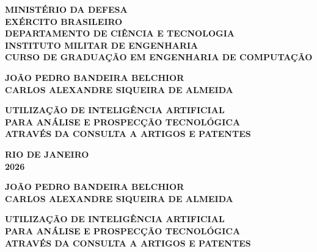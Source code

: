 \documentclass[12pt, a4paper]{article}
\begin{document}
\pagestyle{empty}

\begin{center}

  {\fontsize{12}{14}\selectfont\bfseries
    MINISTÉRIO DA DEFESA \\
    EXÉRCITO BRASILEIRO \\
    DEPARTAMENTO DE CIÊNCIA E TECNOLOGIA \\
    INSTITUTO MILITAR DE ENGENHARIA \\
    CURSO DE GRADUAÇÃO EM ENGENHARIA DE COMPUTAÇÃO
  }

  \vspace{6cm}

  {\fontsize{12}{16}\selectfont\bfseries
    JOÃO PEDRO BANDEIRA BELCHIOR \\[4pt]
    CARLOS ALEXANDRE SIQUEIRA DE ALMEIDA
  }

  \vspace{3cm}

  {\fontsize{12}{16}\selectfont\bfseries
    UTILIZAÇÃO DE INTELIGÊNCIA ARTIFICIAL \\
    PARA ANÁLISE E PROSPECÇÃO TECNOLÓGICA \\
    ATRAVÉS DA CONSULTA A ARTIGOS E PATENTES
  }

  \vfill

  {\fontsize{12}{16}\selectfont\bfseries
    RIO DE JANEIRO \\
    2026
  }

\end{center}

\newpage

\begin{center}

  {\fontsize{12}{16}\selectfont\bfseries
    JOÃO PEDRO BANDEIRA BELCHIOR \\[4pt]
    CARLOS ALEXANDRE SIQUEIRA DE ALMEIDA
  }

  \vspace{4cm}

  {\fontsize{12}{16}\selectfont\bfseries
    UTILIZAÇÃO DE INTELIGÊNCIA ARTIFICIAL \\
    PARA ANÁLISE E PROSPECÇÃO TECNOLÓGICA \\
    ATRAVÉS DA CONSULTA A ARTIGOS E PATENTES
  }

  \vspace{3cm}

\end{center}
\end{document}
